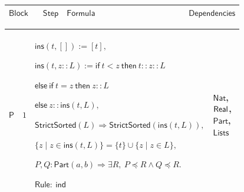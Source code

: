 \documentclass[12pt,reqno]{amsart}
\theoremstyle{blueplain}
\numberwithin{equation}{section}
\newlength{\FTCOneColumnBody}
\begin{document}
{\scriptsize {\ }}

{\scriptsize \setlength{\parskip}{0pt}\nointerlineskip
\noindent 
\begin{tabular}{|@{}>{\centering\arraybackslash}m{\FTCOneColumnBody}|}
\hline
$\displaystyle \mathsf{DarbouxConstruction}$ \\ \hline
\end{tabular}%
}

{\scriptsize \setlength{\parskip}{0pt}\nointerlineskip
\noindent 
\begin{tabular}{|@{}>{\centering\arraybackslash}m{0.10658\linewidth}|>{\centering\arraybackslash}m{0.03553\linewidth}|>{\centering\arraybackslash}m{0.52105\linewidth}|>{\centering\arraybackslash}m{0.23684\linewidth}|}
\hline
$\displaystyle \mathsf{Block}$ & $\displaystyle \mathsf{Step}$ & $%
\displaystyle \mathsf{Formula}$ & $\displaystyle \mathsf{Dependencies}$ \\ 
\hline
\end{tabular}%
}

{\scriptsize \setlength{\parskip}{0pt}\nointerlineskip
\noindent 
\begin{tabular}{|@{}>{\centering\arraybackslash}m{\FTCOneColumnBody}|}
\hline
$\displaystyle \mathsf{Context\_P}:=$\par$\displaystyle a<b,\quad\mathsf{Bdd}%
(f;a,b),$\par$\displaystyle M\ge0,\quad\forall x\in I(a,b),\ |f(x)|\le M.$
\\ \hline
\end{tabular}%
}

{\scriptsize \setlength{\parskip}{0pt}\nointerlineskip
\noindent 
\begin{tabular}{|@{}>{\centering\arraybackslash}m{0.10658\linewidth}|>{\centering\arraybackslash}m{0.03553\linewidth}|>{\centering\arraybackslash}m{0.52105\linewidth}|>{\centering\arraybackslash}m{0.23684\linewidth}|}
\hline
\hypertarget{proof:P1}{$\displaystyle \mathsf{P}$} & $\displaystyle 1$ & $%
\displaystyle \mathsf{ins}(t,[]):=[t],$\par$\displaystyle \mathsf{ins}%
(t,z::L):=\mathsf{if}\ t<z\ \mathsf{then}\ t::z::L$\par$\displaystyle 
\mathsf{else\ if}\ t=z\ \mathsf{then}\ z::L$\par$\displaystyle \mathsf{else}%
\ z::\mathsf{ins}(t,L),$\par$\displaystyle \mathsf{StrictSorted}%
(L)\Rightarrow\mathsf{StrictSorted}(\mathsf{ins}(t,L)),$\par$\displaystyle %
\{z\mid z\in\mathsf{ins}(t,L)\}=\{t\}\cup\{z\mid z\in L\},$\par$%
\displaystyle P,Q:\mathsf{Part}(a,b)\Rightarrow\exists R,\ P\preceq R\land
Q\preceq R.$\par$\displaystyle \mathsf{Rule}:\ \mathsf{ind}$ & \hyperlink{ax:Nat}%
{$\displaystyle \mathsf{Nat}$}, \hyperlink{ax:Real}{$\displaystyle \mathsf{%
Real}$}, \hyperlink{def:Part}{$\displaystyle \mathsf{Part}$}, \hyperlink{def:Lists}%
{$\displaystyle \mathsf{Lists}$} \\ \hline
\end{tabular}%
}
\end{document}
